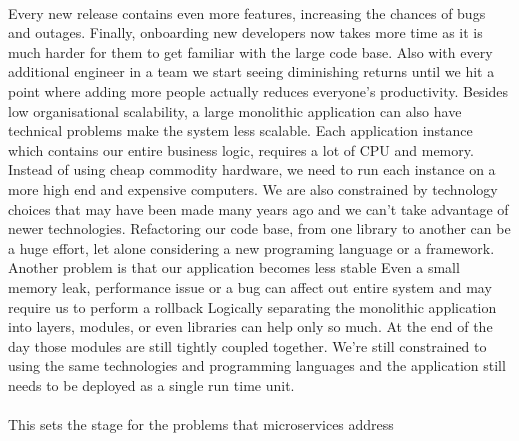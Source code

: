 \documentclass[a4paper, 11pt]{book}
\begin{document}
    \paragraph{}
    Every new release contains even more features, increasing the chances of bugs and outages.
    Finally, onboarding new developers now takes more time as it is much harder for them to get familiar with the large code base.
    Also with every additional engineer in a team we start seeing diminishing returns until we hit a point where adding more people actually reduces everyone's productivity.
    Besides low organisational scalability, a large monolithic application can also have technical problems make the system less scalable.
    Each application instance which contains our entire business logic, requires a lot of CPU and memory.
    Instead of using cheap commodity hardware, we need to run each instance on a more high end and expensive computers.
    We are also constrained by technology choices that may have been made many years ago and we can't take advantage of newer technologies.
    Refactoring our code base, from one library to another can be a huge effort, let alone considering a new programing language or a framework.
    Another problem is that our application becomes less stable
    Even a small memory leak, performance issue or a bug can affect out entire system and may require us to perform a rollback
    Logically separating the monolithic application into layers, modules, or even libraries can help only so much.
    At the end of the day those modules are still tightly coupled together.
    We're still constrained to using the same technologies and programming languages and the application still needs to be deployed as a single run time unit.

    \paragraph{}
    This sets the stage for the problems that microservices address
\end{document}
